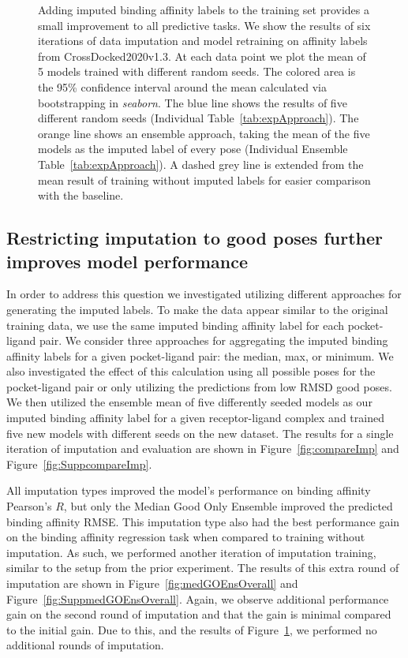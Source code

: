 \documentclass[journal=jcim,manuscript=article]{achemso}
\begin{document}
\begin{figure}[tbph]
    \caption{Adding imputed binding affinity labels to the training set provides a small improvement to all predictive tasks. We show the results of six iterations of data imputation and model retraining on affinity labels from CrossDocked2020v1.3. At each data point we plot the mean of 5 models trained with different random seeds. The colored area is the 95\% confidence interval around the mean calculated via bootstrapping in \textit{seaborn}. The blue line shows the results of five different random seeds (Individual Table~\ref{tab:expApproach}). The orange line shows an ensemble approach, taking the mean of the five models as the imputed label of every pose (Individual Ensemble Table~\ref{tab:expApproach}). A dashed grey line is extended from the mean result of training without imputed labels for easier comparison with the baseline.}
    \label{fig:initialImp}
\end{figure}


\subsection{Restricting imputation to good poses further improves model performance}
In order to address this question we investigated utilizing different approaches for generating the imputed labels.
To make the data appear similar to the original training data, we use the same imputed binding affinity label for each pocket-ligand pair.
We consider three approaches for aggregating the imputed binding affinity labels for a given pocket-ligand pair: the median, max, or minimum.
We also investigated the effect of this calculation using all possible poses for the pocket-ligand pair or only utilizing the predictions from low RMSD good poses.
We then utilized the ensemble mean of five differently seeded models as our imputed binding affinity label for a given receptor-ligand complex and trained five new models with different seeds on the new dataset.
The results for a single iteration of imputation and evaluation are shown in Figure~\ref{fig:compareImp} and Figure~\ref{fig:SuppcompareImp}.

All imputation types improved the model's performance on binding affinity Pearson's $R$, but only the Median Good Only Ensemble improved the predicted binding affinity RMSE.
This imputation type also had the best performance gain on the binding affinity regression task when compared to training without imputation.
As such, we performed another iteration of imputation training, similar to the setup from the prior experiment.
The results of this extra round of imputation are shown in Figure~\ref{fig:medGOEnsOverall} and Figure~\ref{fig:SuppmedGOEnsOverall}.
Again, we observe additional performance gain on the second round of imputation and that the gain is minimal compared to the initial gain.
Due to this, and the results of Figure~\ref{fig:initialImp}, we performed no additional rounds of imputation.
\end{document}
